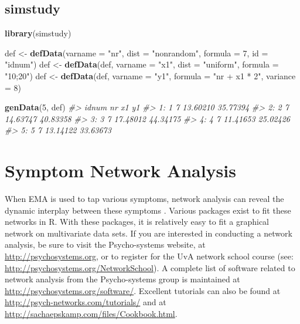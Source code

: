 \documentclass[]{book}
\newenvironment{Shaded}{\begin{snugshade}}{\end{snugshade}}
\newcommand{\KeywordTok}[1]{\textcolor[rgb]{0.13,0.29,0.53}{\textbf{#1}}}
\newcommand{\DataTypeTok}[1]{\textcolor[rgb]{0.13,0.29,0.53}{#1}}
\newcommand{\DecValTok}[1]{\textcolor[rgb]{0.00,0.00,0.81}{#1}}
\newcommand{\StringTok}[1]{\textcolor[rgb]{0.31,0.60,0.02}{#1}}
\newcommand{\CommentTok}[1]{\textcolor[rgb]{0.56,0.35,0.01}{\textit{#1}}}
\newcommand{\NormalTok}[1]{#1}
\begin{document}
\subsection{simstudy}\label{simstudy}

\begin{Shaded}
\begin{Highlighting}[]
\KeywordTok{library}\NormalTok{(simstudy)}

\NormalTok{def <-}\StringTok{ }\KeywordTok{defData}\NormalTok{(}\DataTypeTok{varname =} \StringTok{"nr"}\NormalTok{, }\DataTypeTok{dist =} \StringTok{"nonrandom"}\NormalTok{, }\DataTypeTok{formula =} \DecValTok{7}\NormalTok{, }\DataTypeTok{id =} \StringTok{"idnum"}\NormalTok{)}
\NormalTok{def <-}\StringTok{ }\KeywordTok{defData}\NormalTok{(def, }\DataTypeTok{varname =} \StringTok{"x1"}\NormalTok{, }\DataTypeTok{dist =} \StringTok{"uniform"}\NormalTok{, }\DataTypeTok{formula =} \StringTok{"10;20"}\NormalTok{)}
\NormalTok{def <-}\StringTok{ }\KeywordTok{defData}\NormalTok{(def, }\DataTypeTok{varname =} \StringTok{"y1"}\NormalTok{, }\DataTypeTok{formula =} \StringTok{"nr + x1 * 2"}\NormalTok{, }\DataTypeTok{variance =} \DecValTok{8}\NormalTok{)}

\KeywordTok{genData}\NormalTok{(}\DecValTok{5}\NormalTok{, def)}
\CommentTok{#>    idnum nr       x1       y1}
\CommentTok{#> 1:     1  7 13.60210 35.77394}
\CommentTok{#> 2:     2  7 14.63747 40.83358}
\CommentTok{#> 3:     3  7 17.48012 44.34175}
\CommentTok{#> 4:     4  7 11.41653 25.02426}
\CommentTok{#> 5:     5  7 13.14122 33.63673}
\end{Highlighting}
\end{Shaded}

\section{Symptom Network Analysis}\label{symptom-network-analysis}

 

When EMA is used to tap various symptoms, network analysis can reveal
the dynamic interplay between these symptoms
\citep{Borsboom2013, Borsboom2017, Bringmann2015}. Various packages
exist to fit these networks in R. With these packages, it is relatively
easy to fit a graphical network on multivariate data sets. If you are
interested in conducting a network analysis, be sure to visit the
Psycho-systems website, at \url{http://psychosystems.org}, or to
register for the UvA network school course (see:
\url{http://psychosystems.org/NetworkSchool}). A complete list of
software related to network analysis from the Psycho-systems group is
maintained at \url{http://psychosystems.org/software/}. Excellent
tutorials can also be found at
\url{http://psych-networks.com/tutorials/} and at
\url{http://sachaepskamp.com/files/Cookbook.html}.
\end{document}
